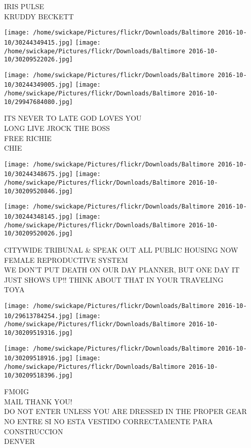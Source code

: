 \documentclass[10pt,letterpaper]{article}
\begin{document}
IRIS PULSE\\
KRUDDY BECKETT
\pagebreak

\texttt{[image: /home/swickape/Pictures/flickr/Downloads/Baltimore 2016-10-10/30244349415.jpg]}
\texttt{[image: /home/swickape/Pictures/flickr/Downloads/Baltimore 2016-10-10/30209522026.jpg]}

\texttt{[image: /home/swickape/Pictures/flickr/Downloads/Baltimore 2016-10-10/30244349005.jpg]}
\texttt{[image: /home/swickape/Pictures/flickr/Downloads/Baltimore 2016-10-10/29947684080.jpg]}

ITS NEVER TO LATE GOD LOVES YOU\\
LONG LIVE JROCK THE BOSS\\
FREE RICHIE\\
CHIE
\pagebreak

\texttt{[image: /home/swickape/Pictures/flickr/Downloads/Baltimore 2016-10-10/30244348675.jpg]}
\texttt{[image: /home/swickape/Pictures/flickr/Downloads/Baltimore 2016-10-10/30209520846.jpg]}

\texttt{[image: /home/swickape/Pictures/flickr/Downloads/Baltimore 2016-10-10/30244348145.jpg]}
\texttt{[image: /home/swickape/Pictures/flickr/Downloads/Baltimore 2016-10-10/30209520026.jpg]}

CITYWIDE TRIBUNAL \& SPEAK OUT ALL PUBLIC HOUSING NOW\\
FEMALE REPRODUCTIVE SYSTEM\\
WE DON'T PUT DEATH ON OUR DAY PLANNER, BUT ONE DAY IT JUST SHOWS UP!! THINK ABOUT THAT IN YOUR TRAVELING\\
TOYA
\pagebreak

\texttt{[image: /home/swickape/Pictures/flickr/Downloads/Baltimore 2016-10-10/29613784254.jpg]}
\texttt{[image: /home/swickape/Pictures/flickr/Downloads/Baltimore 2016-10-10/30209519316.jpg]}

\texttt{[image: /home/swickape/Pictures/flickr/Downloads/Baltimore 2016-10-10/30209518916.jpg]}
\texttt{[image: /home/swickape/Pictures/flickr/Downloads/Baltimore 2016-10-10/30209518396.jpg]}

FMOIG\\
MAIL THANK YOU!\\
DO NOT ENTER UNLESS YOU ARE DRESSED IN THE PROPER GEAR NO ENTRE SI NO ESTA VESTIDO CORRECTAMENTE PARA CONSTRUCCION\\
DENVER
\pagebreak
\end{document}
